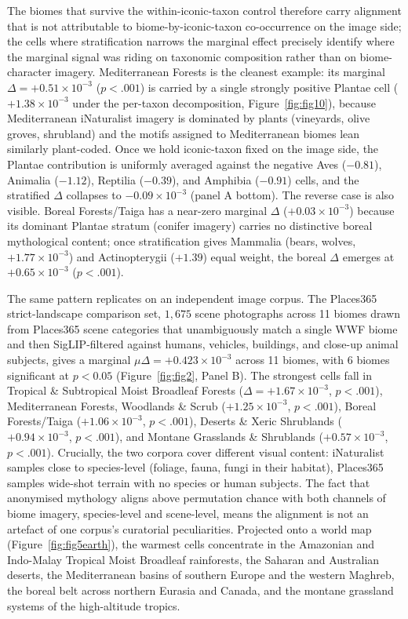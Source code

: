 \documentclass[11pt,a4paper]{article}
\begin{document}
The biomes that survive the within-iconic-taxon control therefore
carry alignment that is not attributable to biome-by-iconic-taxon
co-occurrence on the image side; the cells where stratification
narrows the marginal effect precisely identify where the marginal
signal was riding on taxonomic composition rather than on
biome-character imagery. Mediterranean Forests is the cleanest
example: its marginal $\Delta = +0.51\times 10^{-3}$ ($p<.001$) is
carried by a single strongly positive Plantae cell ($+1.38\times
10^{-3}$ under the per-taxon decomposition, Figure~\ref{fig:fig10}),
because Mediterranean iNaturalist imagery is dominated by plants
(vineyards, olive groves, shrubland) and the motifs assigned to
Mediterranean biomes lean similarly plant-coded. Once we hold
iconic-taxon fixed on the image side, the Plantae contribution is
uniformly averaged against the negative Aves ($-0.81$), Animalia
($-1.12$), Reptilia ($-0.39$), and Amphibia ($-0.91$) cells, and
the stratified $\Delta$ collapses to $-0.09\times 10^{-3}$ (panel
A bottom). The reverse case is also visible. Boreal Forests/Taiga
has a near-zero marginal $\Delta$ ($+0.03\times 10^{-3}$) because
its dominant Plantae stratum (conifer imagery) carries no
distinctive boreal mythological content; once stratification
gives Mammalia (bears, wolves, $+1.77\times 10^{-3}$) and
Actinopterygii ($+1.39$) equal weight, the boreal $\Delta$
emerges at $+0.65\times 10^{-3}$ ($p<.001$).

The same pattern replicates on an independent image corpus. The
Places365 strict-landscape comparison set, $1{,}675$ scene
photographs across 11 biomes drawn from Places365 scene categories
that unambiguously match a single WWF biome and then
SigLIP-filtered against humans, vehicles, buildings, and close-up
animal subjects, gives a marginal $\mu\Delta = +0.423\times 10^{-3}$
across 11 biomes, with 6 biomes significant at $p<0.05$
(Figure~\ref{fig:fig2}, Panel B). The strongest cells fall in
Tropical \& Subtropical Moist Broadleaf Forests ($\Delta = +1.67
\times 10^{-3}$, $p<.001$), Mediterranean Forests, Woodlands \&
Scrub ($+1.25\times 10^{-3}$, $p<.001$), Boreal Forests/Taiga
($+1.06\times 10^{-3}$, $p<.001$), Deserts \& Xeric Shrublands
($+0.94\times 10^{-3}$, $p<.001$), and Montane Grasslands \&
Shrublands ($+0.57\times 10^{-3}$, $p<.001$). Crucially, the two
corpora cover different visual content: iNaturalist samples close
to species-level (foliage, fauna, fungi in their habitat),
Places365 samples wide-shot terrain with no species or human
subjects. The fact that anonymised mythology aligns above
permutation chance with both channels of biome imagery,
species-level and scene-level, means the alignment is not an
artefact of one corpus's curatorial peculiarities. Projected onto
a world map (Figure~\ref{fig:fig5earth}), the warmest cells
concentrate in the Amazonian and Indo-Malay Tropical Moist
Broadleaf rainforests, the Saharan and Australian deserts, the
Mediterranean basins of southern Europe and the western Maghreb,
the boreal belt across northern Eurasia and Canada, and the
montane grassland systems of the high-altitude tropics.
\end{document}
